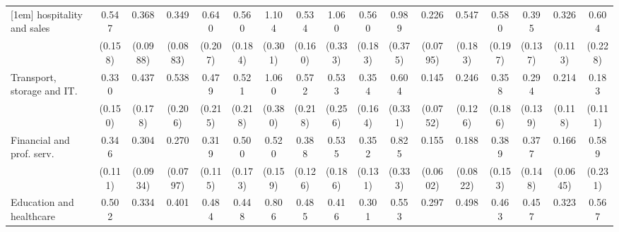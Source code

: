 {\begin{tabular}{l*{16}{c}}
[1em]
hospitality and sales&       0.547\sym{*}  &       0.368\sym{***}&       0.349\sym{***}&       0.640         &       0.560         &       1.104         &       0.534\sym{*}  &       1.060         &       0.560         &       0.989         &       0.226\sym{***}&       0.547         &       0.580         &       0.395\sym{**} &       0.326\sym{**} &       0.604         \\
                    &     (0.158)         &    (0.0988)         &    (0.0883)         &     (0.207)         &     (0.184)         &     (0.301)         &     (0.160)         &     (0.333)         &     (0.183)         &     (0.375)         &    (0.0795)         &     (0.183)         &     (0.197)         &     (0.137)         &     (0.113)         &     (0.228)         \\
[1em]
Transport, storage and IT.&       0.330\sym{*}  &       0.437\sym{*}  &       0.538         &       0.479         &       0.521         &       1.060         &       0.572         &       0.533         &       0.354\sym{*}  &       0.604         &       0.145\sym{***}&       0.246\sym{**} &       0.358\sym{*}  &       0.294\sym{**} &       0.214\sym{**} &       0.183\sym{**} \\
                    &     (0.150)         &     (0.178)         &     (0.206)         &     (0.215)         &     (0.218)         &     (0.380)         &     (0.218)         &     (0.256)         &     (0.164)         &     (0.331)         &    (0.0752)         &     (0.126)         &     (0.186)         &     (0.139)         &     (0.118)         &     (0.111)         \\
[1em]
Financial and prof. serv.&       0.346\sym{***}&       0.304\sym{***}&       0.270\sym{***}&       0.319\sym{**} &       0.500\sym{*}  &       0.520\sym{*}  &       0.388\sym{**} &       0.535         &       0.352\sym{**} &       0.825         &       0.155\sym{***}&       0.188\sym{***}&       0.389\sym{*}  &       0.377\sym{*}  &       0.166\sym{***}&       0.589         \\
                    &     (0.111)         &    (0.0934)         &    (0.0797)         &     (0.115)         &     (0.173)         &     (0.159)         &     (0.126)         &     (0.186)         &     (0.131)         &     (0.333)         &    (0.0602)         &    (0.0822)         &     (0.153)         &     (0.148)         &    (0.0645)         &     (0.231)         \\
[1em]
Education and healthcare&       0.502\sym{*}  &       0.334\sym{***}&       0.401\sym{**} &       0.484\sym{*}  &       0.448\sym{*}  &       0.806         &       0.485\sym{*}  &       0.416\sym{*}  &       0.301\sym{***}&       0.553         &       0.297\sym{***}&       0.498         &       0.463\sym{*}  &       0.457\sym{*}  &       0.323\sym{**} &       0.567         \\

\end{tabular}}
